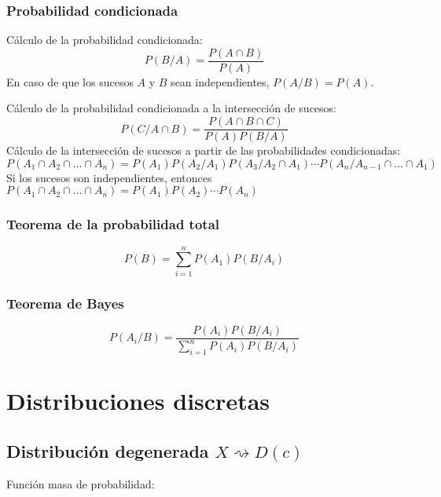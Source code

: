 \documentclass[11pt,twoside,titlepage,a4paper]{article}
\theoremstyle{definition}
\theoremstyle{plain_rojo}
\theoremstyle{remark}
\begin{document}
\subsubsection*{Probabilidad condicionada}

Cálculo de la probabilidad condicionada:
$$P(B/A)=\displaystyle\frac{P(A\cap B)}{P(A)}$$
En caso de que los sucesos $A$ y $B$ sean independientes, $P(A/B)=P(A)$.

Cálculo de la probabilidad condicionada a la intersección de sucesos:
$$P(C/A\cap B)=\displaystyle\frac{P(A\cap B\cap C)}{P(A)P(B/A)}$$
Cálculo de la intersección de sucesos a partir de las probabilidades condicionadas:
$$P(A_1\cap A_2\cap\ldots\cap A_n)=P(A_1)P(A_2/A_1)P(A_3/A_2\cap A_1)\cdots P(A_n/A_{n-1}\cap\ldots\cap A_1)$$
Si los sucesos son independientes, entonces $P(A_1\cap A_2\cap\ldots\cap A_n)=P(A_1)P(A_2)\cdots P(A_n)$

\subsubsection*{Teorema de la probabilidad total}

$$P(B)=\displaystyle\sum_{i=1}^{n}P(A_1)P(B/A_i)$$

\subsubsection*{Teorema de Bayes}

$$P(A_i/B)=\displaystyle\frac{P(A_i)P(B/A_i)}{\sum_{i=1}^{n}P(A_i)P(B/A_i)}$$

\newpage
\section{Distribuciones discretas}

\subsection{Distribución degenerada $X\rightsquigarrow D(c)$}

Función masa de probabilidad:
\end{document}
